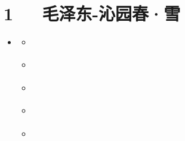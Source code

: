 \documentclass[letterpaper,10pt,english]{sphinxmanual}
\begin{document}
\chapter{1   毛泽东-沁园春·雪}
\label{\detokenize{p01_u6563_u6587/_u6bdb_u6cfd_u4e1c-_u6c81_u56ed_u6625_xb7_u96ea:id1}}\label{\detokenize{p01_u6563_u6587/_u6bdb_u6cfd_u4e1c-_u6c81_u56ed_u6625_xb7_u96ea::doc}}
\begin{sphinxShadowBox}
\begin{itemize}
\item {} 
\label{\detokenize{p01_u6563_u6587/_u6bdb_u6cfd_u4e1c-_u6c81_u56ed_u6625_xb7_u96ea:id8}}{\hyperref[\detokenize{p01_u6563_u6587/_u6bdb_u6cfd_u4e1c-_u6c81_u56ed_u6625_xb7_u96ea:id1}]{}}
\begin{itemize}
\item {} 
\label{\detokenize{p01_u6563_u6587/_u6bdb_u6cfd_u4e1c-_u6c81_u56ed_u6625_xb7_u96ea:id9}}{\hyperref[\detokenize{p01_u6563_u6587/_u6bdb_u6cfd_u4e1c-_u6c81_u56ed_u6625_xb7_u96ea:id3}]{}}

\item {} 
\label{\detokenize{p01_u6563_u6587/_u6bdb_u6cfd_u4e1c-_u6c81_u56ed_u6625_xb7_u96ea:id10}}{\hyperref[\detokenize{p01_u6563_u6587/_u6bdb_u6cfd_u4e1c-_u6c81_u56ed_u6625_xb7_u96ea:id4}]{}}

\item {} 
\label{\detokenize{p01_u6563_u6587/_u6bdb_u6cfd_u4e1c-_u6c81_u56ed_u6625_xb7_u96ea:id11}}{\hyperref[\detokenize{p01_u6563_u6587/_u6bdb_u6cfd_u4e1c-_u6c81_u56ed_u6625_xb7_u96ea:id5}]{}}

\item {} 
\label{\detokenize{p01_u6563_u6587/_u6bdb_u6cfd_u4e1c-_u6c81_u56ed_u6625_xb7_u96ea:id12}}{\hyperref[\detokenize{p01_u6563_u6587/_u6bdb_u6cfd_u4e1c-_u6c81_u56ed_u6625_xb7_u96ea:id6}]{}}

\item {} 
\label{\detokenize{p01_u6563_u6587/_u6bdb_u6cfd_u4e1c-_u6c81_u56ed_u6625_xb7_u96ea:id13}}{\hyperref[\detokenize{p01_u6563_u6587/_u6bdb_u6cfd_u4e1c-_u6c81_u56ed_u6625_xb7_u96ea:id7}]{}}

\end{itemize}

\end{itemize}
\end{sphinxShadowBox}
\end{document}
